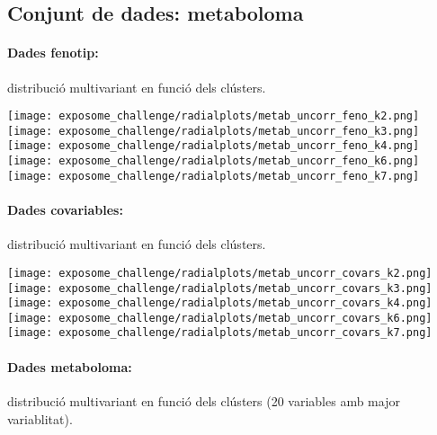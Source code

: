 \documentclass[CAT,BIB]{TFUOC}%
\begin{document}
        \subsection{Conjunt de dades: metaboloma}

            \paragraph{Dades fenotip:} distribució multivariant en funció dels clústers.

            \begin{center}
                \texttt{[image: exposome\_challenge/radialplots/metab\_uncorr\_feno\_k2.png]}
                \texttt{[image: exposome\_challenge/radialplots/metab\_uncorr\_feno\_k3.png]}
                \texttt{[image: exposome\_challenge/radialplots/metab\_uncorr\_feno\_k4.png]}
                \texttt{[image: exposome\_challenge/radialplots/metab\_uncorr\_feno\_k6.png]}
                \texttt{[image: exposome\_challenge/radialplots/metab\_uncorr\_feno\_k7.png]}
            \end{center}

            \paragraph{Dades covariables:} distribució multivariant en funció dels clústers.

            \begin{center}
                \texttt{[image: exposome\_challenge/radialplots/metab\_uncorr\_covars\_k2.png]}
                \texttt{[image: exposome\_challenge/radialplots/metab\_uncorr\_covars\_k3.png]}
                \texttt{[image: exposome\_challenge/radialplots/metab\_uncorr\_covars\_k4.png]}
                \texttt{[image: exposome\_challenge/radialplots/metab\_uncorr\_covars\_k6.png]}
                \texttt{[image: exposome\_challenge/radialplots/metab\_uncorr\_covars\_k7.png]}
            \end{center}

            \paragraph{Dades metaboloma:} distribució multivariant en funció dels clústers (20 variables amb major variablitat).
\end{document}
